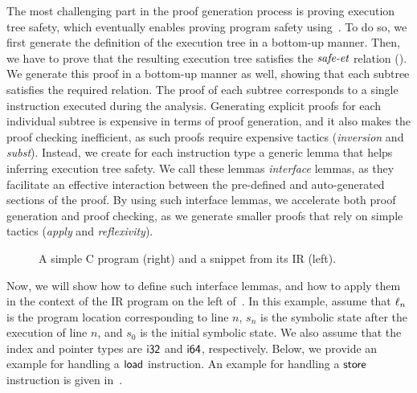 
The most challenging part in the proof generation process is proving execution tree safety,
which eventually enables proving program safety using~.
To do so, we first generate the definition of the execution tree in a bottom-up manner.
Then, we have to prove that the resulting execution tree satisfies the $\textit{safe-et}$ relation ().
We generate this proof in a bottom-up manner as well, showing that each subtree satisfies the required relation.
The proof of each subtree corresponds to a single instruction executed during the analysis.
Generating explicit proofs for each individual subtree is expensive in terms of proof generation,
and it also makes the proof checking inefficient,
as such proofs require expensive \coq tactics (\eg \textit{inversion} and \textit{subst}).
Instead, we create for each instruction type a generic lemma that helps inferring execution tree safety.
We call these lemmas \emph{interface} lemmas,
as they facilitate an effective interaction between the pre-defined and auto-generated sections of the proof.
By using such interface lemmas,
we accelerate both proof generation and proof checking,
as we generate smaller proofs that rely on simple \coq tactics (\eg \textit{apply} and \textit{reflexivity}).

\begin{figure}
\begin{minipage}[t]{0.60\columnwidth}

\end{minipage}
\begin{minipage}[t]{0.38\columnwidth}

\end{minipage}
\caption{A simple C program (right) and a snippet from its \llvm IR (left).}
\label{figure:example-llvm}
\end{figure}

Now, we will show how to define such interface lemmas,
and how to apply them in the context of the \llvm IR program on the left of~.
In this example,
assume that $\ell_n$ is the program location corresponding to line $n$,
$s_n$ is the symbolic state after the execution of line $n$,
and $s_0$ is the initial symbolic state.
We also assume that the index and pointer types are $\textsf{i32}$ and $\textsf{i64}$, respectively.
Below, we provide an example for handling a $\textsf{load}$ instruction.
An example for handling a $\textsf{store}$ instruction is given in~.

